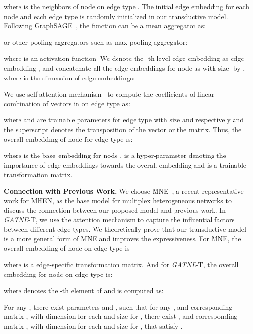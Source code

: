 \documentclass[sigconf]{acmart}
\newcommand{\model}{{\em GATNE}}
\newcommand{\bi}{base}
\newcommand{\hide}[1]{} \newcommand{\jie}[1]{\textbf{\color{red}[(JT: #1 )]}}  \newcommand{\vpara}[1]{\vspace{0.07in}\noindent\textbf{#1 }}
\begin{document}
\noindent where \hide{ is the dimension of edge embeddings,  is the total aggregation levels and}  is the neighbors of node  on edge type . The initial edge embedding  for each node  and each edge type  is randomly initialized in our transductive model. Following GraphSAGE~\cite{hamilton2017inductive}, the  function can be a mean aggregator as:


\noindent or other pooling aggregators such as max-pooling aggregator:


\noindent where  is an activation function.
We denote the -th level edge embedding  as edge embedding , and concatenate all the edge embeddings for node  as  with size -by-, where  is the dimension of edge-embeddings:


We use self-attention mechanism~\cite{lin2017structured} to compute the coefficients  of linear combination of vectors in  on edge type  as:


\noindent where  and  are trainable parameters for edge type  with size  and  respectively and the superscript  denotes the transposition of the vector or the matrix. Thus, the overall embedding of node  for edge type  is:


\noindent where  is the \bi\ embedding for node ,  is a hyper-parameter denoting the importance of edge embeddings towards the overall embedding and  is a trainable transformation matrix.


\vpara{Connection with Previous Work.} 
We choose MNE~\cite{ijcai2018-428}, a recent representative work for MHEN, as the base model for multiplex heterogeneous networks to discuss the connection between our proposed model and previous work. 
In \model-T, we use the attention mechanism to capture the influential factors between different edge types. We  theoretically prove that 
our transductive model  
is a more general form of 
MNE and improves the expressiveness.
For MNE, the overall embedding  of node  on edge type  is 

\noindent where  is a edge-specific transformation matrix.
And for \model-T, the overall embedding for node  on edge type  is:


\noindent where  denotes the -th element of  and is computed as:


\begin{theorem}
\label{thm}
For any , there exist parameters  and , such that for any , and corresponding matrix , with dimension  for each  and size  for , there exist , and corresponding matrix , with dimension  for each  and size  for , that satisfy .
\end{theorem}
\end{document}
